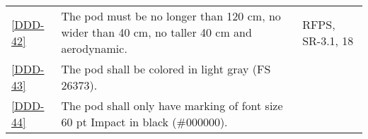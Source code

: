 \documentclass[Main]{subfiles}
\begin{document}
\begin{longtable}{l p{10.4cm} p{1.8cm} }
\ref{DDD-42} & The pod must be no longer than 120 cm, no wider than 40 cm, no taller 40 cm and aerodynamic. & RFPS, SR-3.1, 18\\

\ref{DDD-43} & The pod shall be colored in light gray (FS 26373). & \\

\ref{DDD-44} & The pod shall only have marking of font size 60 pt Impact in black (\#000000). & \\
%
%
%
%
%
%
%
%
%
%
%
%
%
%
%



\end{longtable}
\end{document}
